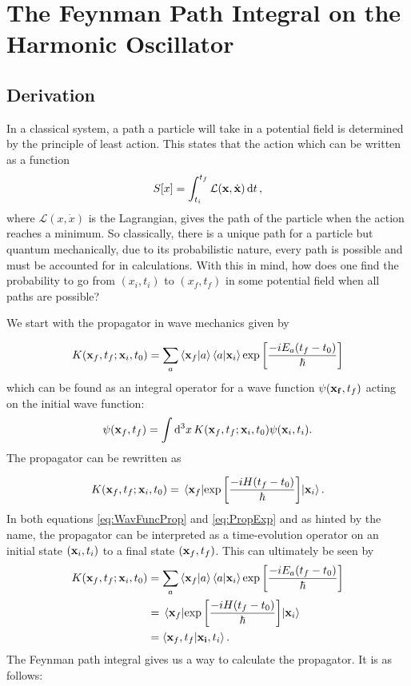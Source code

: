 \documentclass[11pt]{article}
\begin{document}
\section{The Feynman Path Integral on the Harmonic Oscillator}
\subsection{Derivation}
In a classical system, a path a particle will take in a potential field is determined by the principle of least action. This states that the action which can be written as a function 
\begin{align}
	S[x]=\int_{t_i}^{t_f}\mathcal{L}(\vb{x},\dot{\vb{x}})\dd{t},
	\label{eq:Action}
\end{align}
where $\mathcal{L}(x,\dot{x})$ is the Lagrangian, gives the path of the particle when the action reaches a minimum. So classically, there is a unique path for a particle but quantum mechanically, due to its probabilistic nature, every path is possible and must be accounted for in calculations. With this in mind, how does one find the probability to go from $(x_i,t_i)$ to $(x_f,t_f)$ in some potential field when all paths are possible?

We start with the propagator in wave mechanics given by

\begin{align}
	K(\vb{x}_f,t_f;\vb{x}_i,t_0)=\sum_a\bra{\vb{x}_f}\ket{a}\bra{a}\ket{\vb{x}_i}\exp\left[\frac{-iE_a(t_f-t_0)}{\hbar}\right]
\end{align}
which can be found as an integral operator for a wave function $\psi(\vb{x_f},t_f)$ acting on the initial wave function:
\begin{align}
	\psi(\vb{x}_f,t_f)=\int\dd[3]{x}K(\vb{x}_f,t_f;\vb{x}_i,t_0)\psi(\vb{x}_i,t_i).
	\label{eq:WavFuncProp}
\end{align}
The propagator can be rewritten as

\begin{align}
	K(\vb{x}_f,t_f;\vb{x}_i,t_0)=\mel{\vb{x}_f}{\exp\left[\frac{-iH(t_f-t_0)}{\hbar}\right]}{\vb{x}_i}.
	\label{eq:PropExp}
\end{align}
In both equations \ref{eq:WavFuncProp} and \ref{eq:PropExp} and as hinted by the name, the propagator can be interpreted as a time-evolution operator on an initial state $(\vb{x}_i,t_i)$ to a final state $(\vb{x}_f,t_f)$. This can ultimately be seen by
\begin{align}
\begin{split}
	K(\vb{x}_f,t_f;\vb{x}_i,t_0)&=\sum_a\bra{\vb{x}_f}\ket{a}\bra{a}\ket{\vb{x}_i}\exp\left[\frac{-iE_a(t_f-t_0)}{\hbar}\right]\\
	&=\mel{\vb{x}_f}{\exp\left[\frac{-iH(t_f-t_0)}{\hbar}\right]}{\vb{x}_i}\\
	&=\bra{\vb{x}_f,t_f}\ket{\vb{x_i},t_i}.
\end{split}
\end{align}
The Feynman path integral gives us a way to calculate the propagator. It is as follows:
\end{document}
